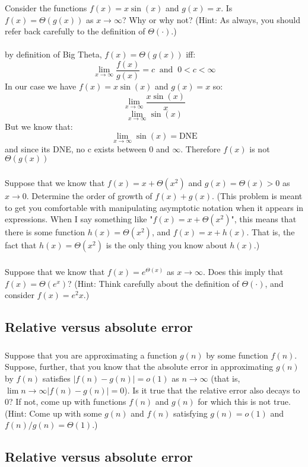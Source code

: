 \documentclass{article}
\begin{document}
\subsubsection{}
Consider the functions $f(x) = x \sin(x)$ and $g(x) = x$. Is $f(x) = \Theta(g(x))$ as $x\to \infty$? Why or
why not? (Hint: As always, you should refer back carefully to the definition of $\Theta(\cdot)$.)
\\\\
by definition of Big Theta, $f(x) = \Theta(g(x))$ iff:
\[\lim_{x\to\infty}\frac{f(x)}{g(x)} = c \;\;\text{and}\;\; 0 < c < \infty\]
In our case we have $f(x) = x \sin(x)$ and $g(x) = x$ so:
\[\lim_{x\to\infty}\frac{x\sin(x)}{x}\]
\[\lim_{x\to\infty}\sin(x)\]
But we know that:
\[\lim_{x\to\infty}\sin(x) = \text{DNE}\]
and since its DNE, no c exists between 0 and $\infty$. Therefore $f(x)$ is not $\Theta(g(x))$

\subsubsection{}
Suppose that we know that $f(x) = x + \Theta(x^2)$ and $g(x) = \Theta(x) > 0$ as $x\to 0$. Determine the order of growth of $f(x) + g(x)$. (This problem is meant to get you comfortable with manipulating asymptotic notation when it appears in expressions. When I say something like "$f(x) = x + \Theta(x^2)$", this means that there is some function $h(x) = \Theta(x^2)$, and $f(x) = x+h(x)$. That is, the fact that $h(x) = \Theta(x^2)$ is the only thing you know about $h(x)$.)

\subsubsection{}
Suppose that we know that $f(x) = e^{\Theta(x)}$ as $x\to\infty$. Does this imply that $f(x) = \Theta(e^x)$? (Hint: Think carefully about the definition of $\Theta(\cdot)$, and consider $f(x) = e^2x$.)


\subsection{Relative versus absolute error}

\subsubsection{}
Suppose that you are approximating a function $g(n)$ by some function $f(n)$. Suppose, further,
that you know that the absolute error in approximating $g(n)$ by $f(n)$ satisfies $|f(n)−g(n)| =
o(1)$ as $n\to \infty$ (that is, $\lim{n\to\infty} |f(n) − g(n)| = 0$). Is it true that the relative error also
decays to 0? If not, come up with functions $f(n)$ and $g(n)$ for which this is not true. (Hint:
Come up with some $g(n)$ and $f(n)$ satisfying $g(n) = o(1)$ and $f(n)/g(n) = \Theta(1)$.)

\subsection{Relative versus absolute error}
\end{document}

